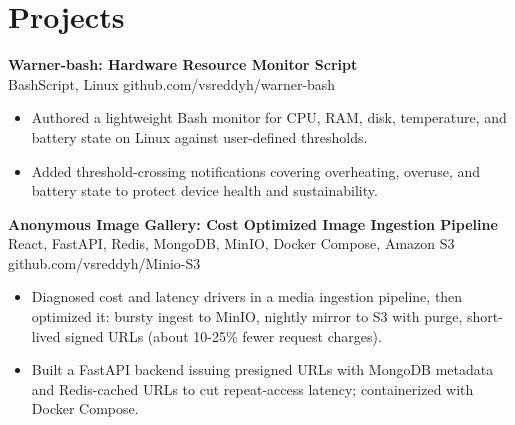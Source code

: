 \documentclass[a4paper,11pt]{article}
\newcommand{\resumeItem}[1]{\item \small{#1}}
\newcommand{\resumeSubheading}[4]{%
  \textbf{#1} \hfill \textbf{#2} \\
{#3} \hfill {#4}
}
\newcommand{\resumeSubHeadingListStart}{\begin{itemize}}
\newcommand{\resumeSubHeadingListEnd}{\end{itemize}}
\begin{document}
\section*{Projects}

\resumeSubheading
{Warner-bash: Hardware Resource Monitor Script}{}{BashScript, Linux}{github.com/vsreddyh/warner-bash}
\resumeSubHeadingListStart
\resumeItem{Authored a lightweight Bash monitor for CPU, RAM, disk, temperature, and battery state on Linux against user-defined thresholds.}
\resumeItem{Added threshold-crossing notifications covering overheating, overuse, and battery state to protect device health and sustainability.}
\resumeSubHeadingListEnd

\resumeSubheading
{Anonymous Image Gallery: Cost Optimized Image Ingestion Pipeline}{}{React, FastAPI, Redis, MongoDB, MinIO, Docker Compose, Amazon S3}{github.com/vsreddyh/Minio-S3}
\resumeSubHeadingListStart
\resumeItem{Diagnosed cost and latency drivers in a media ingestion pipeline, then optimized it: bursty ingest to MinIO, nightly mirror to S3 with purge, short-lived signed URLs (about 10-25\% fewer request charges).}
\resumeItem{Built a FastAPI backend issuing presigned URLs with MongoDB metadata and Redis-cached URLs to cut repeat-access latency; containerized with Docker Compose.}
\resumeSubHeadingListEnd


\vspace{-0.6em}
\end{document}
